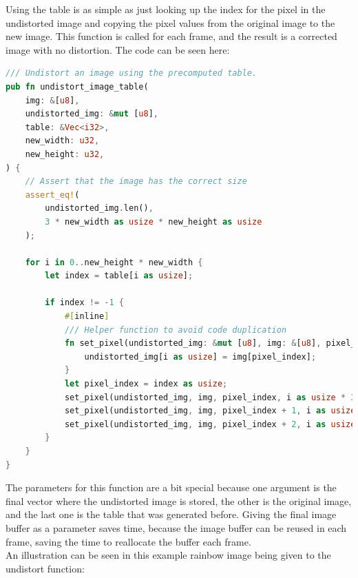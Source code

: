 Using the table is as simple as just looking up the index for the pixel in the undistorted image and copying the pixel values from the original image to the new image.
This function is called for each frame, and the result is a corrected image with no distortion.
The code can be seen here:
\begin{lstlisting}[language=rust,breaklines,label={lst:undistort_image_table}]
/// Undistort an image using the precomputed table.
pub fn undistort_image_table(
    img: &[u8],
    undistorted_img: &mut [u8],
    table: &Vec<i32>,
    new_width: u32,
    new_height: u32,
) {
    // Assert that the image has the correct size
    assert_eq!(
        undistorted_img.len(),
        3 * new_width as usize * new_height as usize
    );

    for i in 0..new_height * new_width {
        let index = table[i as usize];

        if index != -1 {
            #[inline]
            /// Helper function to avoid code duplication
            fn set_pixel(undistorted_img: &mut [u8], img: &[u8], pixel_index: usize, i: usize) {
                undistorted_img[i as usize] = img[pixel_index];
            }
            let pixel_index = index as usize;
            set_pixel(undistorted_img, img, pixel_index, i as usize * 3);
            set_pixel(undistorted_img, img, pixel_index + 1, i as usize * 3 + 1);
            set_pixel(undistorted_img, img, pixel_index + 2, i as usize * 3 + 2);
        }
    }
}
\end{lstlisting}
The parameters for this function are a bit special because one argument is the final vector where the undistorted image is stored, the other is the original image, and the last one is the table that was generated before.
Giving the final image buffer as a parameter saves time, because the image buffer can be reused in each frame, saving the time to reallocate the buffer each frame.
\\
An illustration can be seen in this example rainbow image being given to the undistort function:
